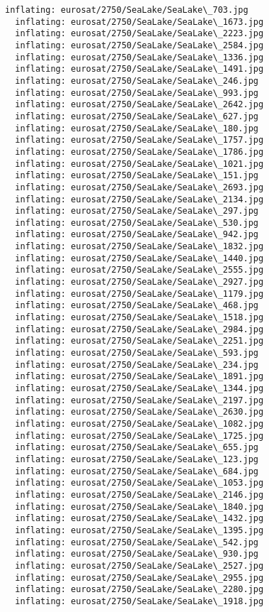 \documentclass[11pt]{article}
\begin{document}
\begin{Verbatim}[commandchars=\\\{\}]
  inflating: eurosat/2750/SeaLake/SeaLake\_703.jpg
  inflating: eurosat/2750/SeaLake/SeaLake\_1673.jpg
  inflating: eurosat/2750/SeaLake/SeaLake\_2223.jpg
  inflating: eurosat/2750/SeaLake/SeaLake\_2584.jpg
  inflating: eurosat/2750/SeaLake/SeaLake\_1336.jpg
  inflating: eurosat/2750/SeaLake/SeaLake\_1491.jpg
  inflating: eurosat/2750/SeaLake/SeaLake\_246.jpg
  inflating: eurosat/2750/SeaLake/SeaLake\_993.jpg
  inflating: eurosat/2750/SeaLake/SeaLake\_2642.jpg
  inflating: eurosat/2750/SeaLake/SeaLake\_627.jpg
  inflating: eurosat/2750/SeaLake/SeaLake\_180.jpg
  inflating: eurosat/2750/SeaLake/SeaLake\_1757.jpg
  inflating: eurosat/2750/SeaLake/SeaLake\_1786.jpg
  inflating: eurosat/2750/SeaLake/SeaLake\_1021.jpg
  inflating: eurosat/2750/SeaLake/SeaLake\_151.jpg
  inflating: eurosat/2750/SeaLake/SeaLake\_2693.jpg
  inflating: eurosat/2750/SeaLake/SeaLake\_2134.jpg
  inflating: eurosat/2750/SeaLake/SeaLake\_297.jpg
  inflating: eurosat/2750/SeaLake/SeaLake\_530.jpg
  inflating: eurosat/2750/SeaLake/SeaLake\_942.jpg
  inflating: eurosat/2750/SeaLake/SeaLake\_1832.jpg
  inflating: eurosat/2750/SeaLake/SeaLake\_1440.jpg
  inflating: eurosat/2750/SeaLake/SeaLake\_2555.jpg
  inflating: eurosat/2750/SeaLake/SeaLake\_2927.jpg
  inflating: eurosat/2750/SeaLake/SeaLake\_1179.jpg
  inflating: eurosat/2750/SeaLake/SeaLake\_468.jpg
  inflating: eurosat/2750/SeaLake/SeaLake\_1518.jpg
  inflating: eurosat/2750/SeaLake/SeaLake\_2984.jpg
  inflating: eurosat/2750/SeaLake/SeaLake\_2251.jpg
  inflating: eurosat/2750/SeaLake/SeaLake\_593.jpg
  inflating: eurosat/2750/SeaLake/SeaLake\_234.jpg
  inflating: eurosat/2750/SeaLake/SeaLake\_1891.jpg
  inflating: eurosat/2750/SeaLake/SeaLake\_1344.jpg
  inflating: eurosat/2750/SeaLake/SeaLake\_2197.jpg
  inflating: eurosat/2750/SeaLake/SeaLake\_2630.jpg
  inflating: eurosat/2750/SeaLake/SeaLake\_1082.jpg
  inflating: eurosat/2750/SeaLake/SeaLake\_1725.jpg
  inflating: eurosat/2750/SeaLake/SeaLake\_655.jpg
  inflating: eurosat/2750/SeaLake/SeaLake\_123.jpg
  inflating: eurosat/2750/SeaLake/SeaLake\_684.jpg
  inflating: eurosat/2750/SeaLake/SeaLake\_1053.jpg
  inflating: eurosat/2750/SeaLake/SeaLake\_2146.jpg
  inflating: eurosat/2750/SeaLake/SeaLake\_1840.jpg
  inflating: eurosat/2750/SeaLake/SeaLake\_1432.jpg
  inflating: eurosat/2750/SeaLake/SeaLake\_1395.jpg
  inflating: eurosat/2750/SeaLake/SeaLake\_542.jpg
  inflating: eurosat/2750/SeaLake/SeaLake\_930.jpg
  inflating: eurosat/2750/SeaLake/SeaLake\_2527.jpg
  inflating: eurosat/2750/SeaLake/SeaLake\_2955.jpg
  inflating: eurosat/2750/SeaLake/SeaLake\_2280.jpg
  inflating: eurosat/2750/SeaLake/SeaLake\_1918.jpg

\end{Verbatim}
\end{document}
